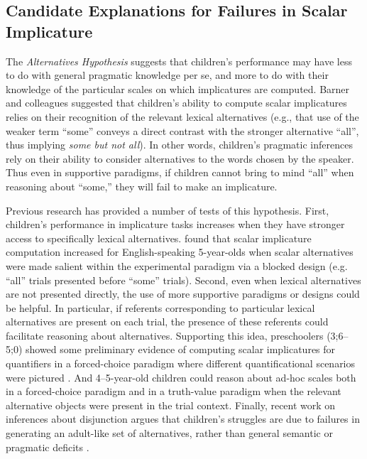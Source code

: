 \documentclass[man]{apa2}
\begin{document}
\subsection{Candidate Explanations for Failures in Scalar Implicature}

The \emph{Alternatives Hypothesis} suggests that children's performance may have less to do with general pragmatic knowledge per se, and more to do with their knowledge of the particular scales on which implicatures are computed. Barner and colleagues \cite{barner2010,barner2011} suggested that children's ability to compute scalar implicatures relies on their recognition of the relevant lexical alternatives (e.g., that use of the weaker term ``some'' conveys a direct contrast with the stronger alternative ``all'', thus implying \emph{some but not all}).  In other words, children's pragmatic inferences rely on their ability to consider alternatives to the words chosen by the speaker. Thus even in supportive paradigms, if children cannot bring to mind ``all'' when reasoning about ``some,'' they will fail to make an implicature.

Previous research has provided a number of tests of this hypothesis. First, children's performance in implicature tasks increases when they have stronger access to specifically lexical alternatives.  found that scalar implicature computation increased for English-speaking 5-year-olds when scalar alternatives were made salient within the experimental paradigm via a blocked design (e.g. ``all'' trials presented before ``some'' trials). Second, even when lexical alternatives are not presented directly, the use of more supportive paradigms or designs could be helpful. In particular, if referents corresponding to particular lexical alternatives are present on each trial, the presence of these referents could facilitate reasoning about alternatives. Supporting this idea, preschoolers (3;6--5;0) showed some preliminary evidence of computing scalar implicatures for quantifiers in a forced-choice paradigm where different quantificational scenarios were pictured \cite{miller2005}. And 4--5-year-old children could reason about ad-hoc scales both in a forced-choice paradigm \cite{stiller2015} and in a truth-value paradigm \cite{barner2011} when the relevant alternative objects were present in the trial context. Finally, recent work on inferences about disjunction argues that children's struggles are due to failures in generating an adult-like set of alternatives, rather than general semantic or pragmatic deficits \cite{singh2016,tieu2016}.
\end{document}
